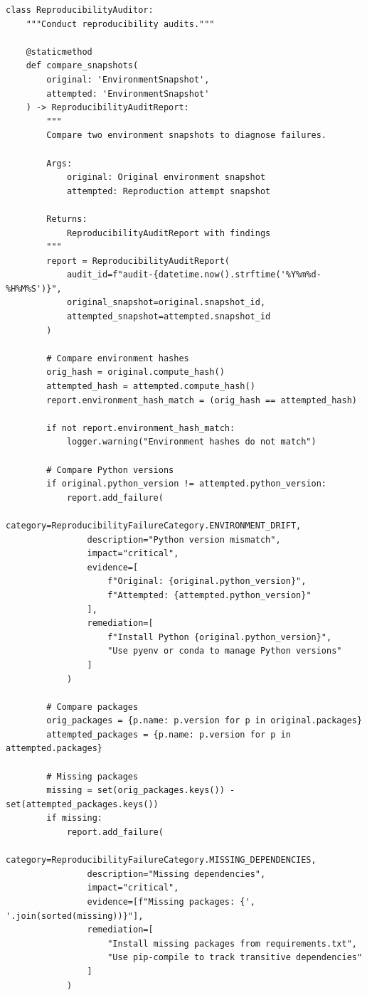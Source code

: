 \begin{lstlisting}[style=python, caption={Post-incident reproducibility audit framework}]
class ReproducibilityAuditor:
    """Conduct reproducibility audits."""

    @staticmethod
    def compare_snapshots(
        original: 'EnvironmentSnapshot',
        attempted: 'EnvironmentSnapshot'
    ) -> ReproducibilityAuditReport:
        """
        Compare two environment snapshots to diagnose failures.

        Args:
            original: Original environment snapshot
            attempted: Reproduction attempt snapshot

        Returns:
            ReproducibilityAuditReport with findings
        """
        report = ReproducibilityAuditReport(
            audit_id=f"audit-{datetime.now().strftime('%Y%m%d-%H%M%S')}",
            original_snapshot=original.snapshot_id,
            attempted_snapshot=attempted.snapshot_id
        )

        # Compare environment hashes
        orig_hash = original.compute_hash()
        attempted_hash = attempted.compute_hash()
        report.environment_hash_match = (orig_hash == attempted_hash)

        if not report.environment_hash_match:
            logger.warning("Environment hashes do not match")

        # Compare Python versions
        if original.python_version != attempted.python_version:
            report.add_failure(
                category=ReproducibilityFailureCategory.ENVIRONMENT_DRIFT,
                description="Python version mismatch",
                impact="critical",
                evidence=[
                    f"Original: {original.python_version}",
                    f"Attempted: {attempted.python_version}"
                ],
                remediation=[
                    f"Install Python {original.python_version}",
                    "Use pyenv or conda to manage Python versions"
                ]
            )

        # Compare packages
        orig_packages = {p.name: p.version for p in original.packages}
        attempted_packages = {p.name: p.version for p in attempted.packages}

        # Missing packages
        missing = set(orig_packages.keys()) - set(attempted_packages.keys())
        if missing:
            report.add_failure(
                category=ReproducibilityFailureCategory.MISSING_DEPENDENCIES,
                description="Missing dependencies",
                impact="critical",
                evidence=[f"Missing packages: {', '.join(sorted(missing))}"],
                remediation=[
                    "Install missing packages from requirements.txt",
                    "Use pip-compile to track transitive dependencies"
                ]
            )


\end{lstlisting}
